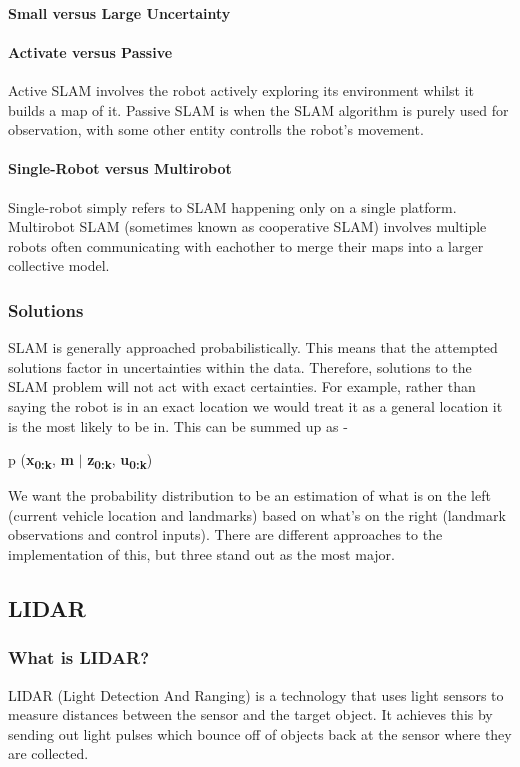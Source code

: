 					\paragraph{Small versus Large Uncertainty}
					
					
					\paragraph{Activate versus Passive}
					Active SLAM involves the robot actively exploring its environment whilst it builds a map of it. Passive SLAM is when the SLAM algorithm is purely used for observation, with some other entity controlls the robot's movement. 
					
					\paragraph{Single-Robot versus Multirobot}
					Single-robot simply refers to SLAM happening only on a single platform. Multirobot SLAM (sometimes known as cooperative SLAM) involves multiple robots often communicating with eachother to merge their maps into a larger collective model. 
				
			
				\subsubsection{Solutions}
				SLAM is generally approached probabilistically. This means that the attempted solutions factor in uncertainties within the data. Therefore, solutions to the SLAM problem will not act with exact certainties. For example, rather than saying the robot is in an exact location we would treat it as a general location it is the most likely to be in. This can be summed up as -
				
				p (\textbf{x\textsubscript{0:k}}, \textbf{m} $\mid$ \textbf{z\textsubscript{0:k}}, \textbf{u\textsubscript{0:k}})
				
				We want the probability distribution to be an estimation of what is on the left (current vehicle location and landmarks) based on what's on the right (landmark observations and control inputs). There are different approaches to the implementation of this, but three stand out as the most major. %
			
			\subsection{LIDAR}
				\subsubsection{What is LIDAR?}
					LIDAR (Light Detection And Ranging) is a technology that uses light sensors to measure distances between the sensor and the target object. It achieves this by sending out light pulses which bounce off of objects back at the sensor where they are collected.
					
